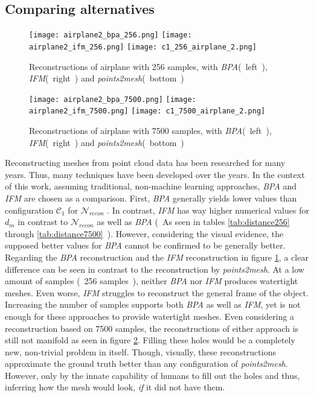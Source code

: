   \subsection*{Comparing alternatives}
  \begin{figure}[htbp]
    \centering
    \texttt{[image: airplane2\_bpa\_256.png]}
    \texttt{[image: airplane2\_ifm\_256.png]}
    \texttt{[image: c1\_256\_airplane\_2.png]}
    \caption{Reconstructions of airplane with 256 samples, with \emph{BPA}(~left~), \emph{IFM}(~right~) and \emph{points2mesh}(~bottom~)} \label{fig:bpaifm}
  \end{figure}

  \begin{figure}[htbp]
    \centering
    \texttt{[image: airplane2\_bpa\_7500.png]}
    \texttt{[image: airplane2\_ifm\_7500.png]}
    \texttt{[image: c1\_7500\_airplane\_2.png]}
    \caption{Reconstructions of airplane with 7500 samples, with \emph{BPA}(~left~), \emph{IFM}(~right~) and \emph{points2mesh}(~bottom~)} \label{fig:bpaifmhigh}
  \end{figure}

  Reconstructing meshes from point cloud data has been researched for many years. Thus, many techniques have been developed over the years.
  In the context of this work, assuming traditional, non-machine learning approaches, \emph{BPA} and \emph{IFM} are chosen as a comparison.
  First, \emph{BPA} generally yields lower values than configuration $\mathcal{C}_1$ for $\mathcal{N}_{recon}$ . In contrast, \emph{IFM} has 
  way higher numerical values for $d_m$ in contrast to $\mathcal{N}_{recon}$ as well as \emph{BPA} (~As seen in tables \ref{tab:distance256} through \ref{tab:distance7500}~).
  However, considering the visual evidence, the supposed better values for \emph{BPA} cannot be confirmed to be generally better.
  Regarding the \emph{BPA} reconstruction and the \emph{IFM} reconstruction in figure \ref{fig:bpaifm}, a clear difference
  can be seen in contrast to the reconstruction by \emph{points2mesh}. At a low amount of samples (~256 samples~), 
  neither \emph{BPA} nor \emph{IFM} produces watertight meshes. Even worse, \emph{IFM} struggles to reconstruct the general frame of the object. 
  Increasing the number of samples supports both \emph{BPA} as well as \emph{IFM}, yet is not enough for these approaches to provide watertight meshes.
  Even considering a reconstruction based on 7500 samples, the reconstructions of either approach is still not manifold as seen in figure \ref{fig:bpaifmhigh}.
  Filling these holes would be a completely new, non-trivial problem in itself. Though, visually, these reconstructions approximate the ground truth better 
  than any configuration of \emph{points2mesh}. However, only by the innate capability of humans to fill out the holes and thus, inferring how the mesh would
  look, \emph{if} it did not have them.

